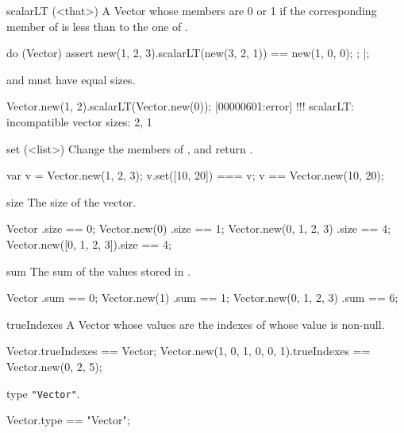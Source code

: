 \begin{urbiscriptapi}
\item[scalarLT](<that>)%
  A Vector whose members are 0 or 1 if the corresponding member of \this is
  less than to the one of \that.
\begin{urbiscript}
do (Vector)
{
  assert
  {
    new(1, 2, 3).scalarLT(new(3, 2, 1)) == new(1, 0, 0);
  };
}|;
\end{urbiscript}
  \this and \that must have equal sizes.
\begin{urbiscript}
Vector.new(1, 2).scalarLT(Vector.new(0));
[00000601:error] !!! scalarLT: incompatible vector sizes: 2, 1
\end{urbiscript}


\item[set](<list>)%
  Change the members of \this, and return \this.
\begin{urbiassert}
var v = Vector.new(1, 2, 3);
v.set([10, 20]) === v;
v == Vector.new(10, 20);
\end{urbiassert}


\item[size]%
  The size of the vector.
\begin{urbiassert}
Vector                  .size == 0;
Vector.new(0)           .size == 1;
Vector.new(0, 1, 2, 3)  .size == 4;
Vector.new([0, 1, 2, 3]).size == 4;
\end{urbiassert}


\item[sum]%
  The sum of the values stored in \this.
\begin{urbiassert}
Vector                  .sum == 0;
Vector.new(1)           .sum == 1;
Vector.new(0, 1, 2, 3)  .sum == 6;
\end{urbiassert}


\item[trueIndexes]%
  A Vector whose values are the indexes of \this whose value is non-null.
\begin{urbiassert}
Vector.trueIndexes == Vector;
Vector.new(1, 0, 1, 0, 0, 1).trueIndexes == Vector.new(0, 2, 5);
\end{urbiassert}


\item[type]%
  \lstinline|"Vector"|.
\begin{urbiassert}
Vector.type == "Vector";
\end{urbiassert}
\end{urbiscriptapi}

